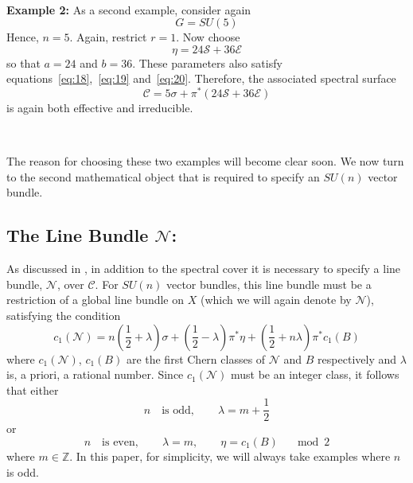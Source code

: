 \documentclass[a4paper,12pt]{article}
\numberwithin{equation}{section}
\def\cC{{\mathcal C}}
\def\cE{{\mathcal E}}
\def\cN{{\mathcal N}}
\def\cS{{\mathcal S}}
\theoremstyle{plain}
\begin{document}
\smallskip

\

\noindent
{\bf Example 2:}
As a second example, consider again
\begin{equation}
G=SU(5)
\label{eq:24}
\end{equation}
Hence, $n=5$. Again, restrict $r=1$. Now choose
\begin{equation}
\eta= 24\cS+36\cE
\label{eq:25}
\end{equation}
so that $a=24$ and $b=36$. These parameters also satisfy
equations~\eqref{eq:18},~\eqref{eq:19} and~\eqref{eq:20}. Therefore,
the associated 
spectral surface
\begin{equation}
\cC=5\sigma+ \pi^{*}(24\cS+36\cE)
\label{eq:26}
\end{equation}
is again both effective and irreducible. 


\smallskip

\

The reason for choosing
these two examples will become clear soon. We now turn to the second
mathematical object that is required to specify an $SU(n)$ vector bundle.

\subsection*{The Line Bundle $\cN$:}

As discussed in \cite{FMW, don2}, in addition to the spectral cover 
it is necessary to 
specify a line bundle, $\cN$, over $\cC$. For $SU(n)$ vector bundles, this
line bundle must be a restriction of a global line bundle on $X$
(which we will again denote by ${\mathcal N}$), satisfying the condition
\begin{equation}
c_{1}(\cN)=n(\frac{1}{2}+\lambda)\sigma+(\frac{1}{2}-\lambda)
\pi^{*}\eta+(\frac{1}{2}+n\lambda)\pi^{*}c_{1}(B)
\label{eq:27}
\end{equation}
where $c_{1}(\cN)$, $c_{1}(B)$ are the first Chern classes of $\cN$ and $B$
respectively and $\lambda$ is, a priori, a rational number. Since $c_{1}(\cN)$
must be an integer class, it follows that either
\begin{equation}
n \quad \mbox{is odd}, \qquad \lambda=m+\frac{1}{2}
\label{eq:28}
\end{equation}
or
\begin{equation}
n \quad \mbox{is even}, \qquad \lambda=m, \qquad \eta=c_{1}(B) \quad \mod 2
\label{eq:29}
\end{equation}
where $m \in {\mathbb Z}$. In this paper, for simplicity, we will always
take examples where $n$ is odd.
\end{document}
